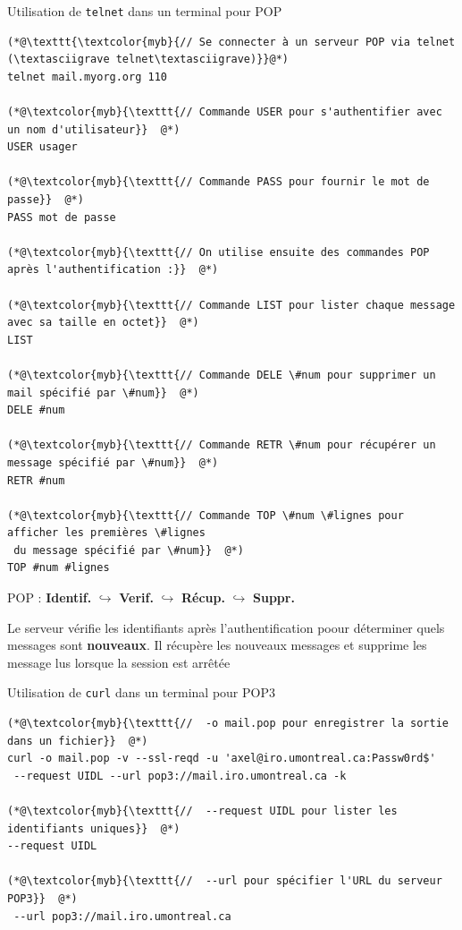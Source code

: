 \documentclass{report}
\begin{document}
\begin{multicols*}{3}
\begin{EExample}{Utilisation de \texttt{telnet} dans un terminal pour POP}{}
\begin{lstlisting}
(*@\texttt{\textcolor{myb}{// Se connecter à un serveur POP via telnet (\textasciigrave telnet\textasciigrave)}}@*)
telnet mail.myorg.org 110

(*@\textcolor{myb}{\texttt{// Commande USER pour s'authentifier avec un nom d'utilisateur}}  @*)
USER usager

(*@\textcolor{myb}{\texttt{// Commande PASS pour fournir le mot de passe}}  @*)
PASS mot de passe

(*@\textcolor{myb}{\texttt{// On utilise ensuite des commandes POP après l'authentification :}}  @*)

(*@\textcolor{myb}{\texttt{// Commande LIST pour lister chaque message avec sa taille en octet}}  @*)
LIST

(*@\textcolor{myb}{\texttt{// Commande DELE \#num pour supprimer un mail spécifié par \#num}}  @*)
DELE #num

(*@\textcolor{myb}{\texttt{// Commande RETR \#num pour récupérer un message spécifié par \#num}}  @*)
RETR #num

(*@\textcolor{myb}{\texttt{// Commande TOP \#num \#lignes pour afficher les premières \#lignes 
 du message spécifié par \#num}}  @*)
TOP #num #lignes

\end{lstlisting}
\end{EExample}


\noindent 
POP : \textbf{Identif.} $\hookrightarrow$ \textbf{Verif.} $\hookrightarrow$ \textbf{Récup.} $\hookrightarrow$ \textbf{Suppr.}

Le serveur vérifie les identifiants après l'authentification poour déterminer quels messages sont \textbf{nouveaux}. Il 
récupère les nouveaux messages et supprime les message lus lorsque la session est arrêtée




\begin{EExample}{Utilisation de \texttt{curl} dans un terminal pour POP3}{}
\begin{lstlisting}
(*@\textcolor{myb}{\texttt{//  -o mail.pop pour enregistrer la sortie dans un fichier}}  @*)
curl -o mail.pop -v --ssl-reqd -u 'axel@iro.umontreal.ca:Passw0rd$'
 --request UIDL --url pop3://mail.iro.umontreal.ca -k

(*@\textcolor{myb}{\texttt{//  --request UIDL pour lister les identifiants uniques}}  @*)
--request UIDL                    

(*@\textcolor{myb}{\texttt{//  --url pour spécifier l'URL du serveur POP3}}  @*)
 --url pop3://mail.iro.umontreal.ca                            


\end{lstlisting}
\end{EExample}
\end{multicols*}
\end{document}

